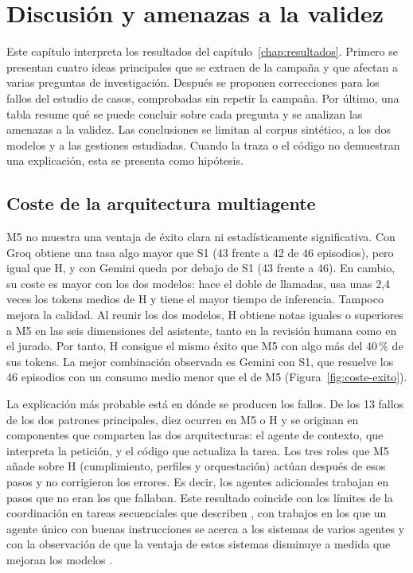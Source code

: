 \chapter{Discusión y amenazas a la validez}
\label{chap:discusion}

Este capítulo interpreta los resultados del capítulo~\ref{chap:resultados}.
Primero se presentan cuatro ideas principales que se extraen de la campaña y
que afectan a varias preguntas de investigación. Después se proponen
correcciones para los fallos del estudio de casos, comprobadas sin repetir la
campaña. Por último, una tabla resume qué se puede concluir sobre cada pregunta
y se analizan las amenazas a la validez. Las conclusiones se limitan al corpus
sintético, a los dos modelos y a las gestiones estudiadas. Cuando la traza o el
código no demuestran una explicación, esta se presenta como hipótesis.

\section{Coste de la arquitectura multiagente}
\label{sec:discusion-coste}

M5 no muestra una ventaja de éxito clara ni estadísticamente significativa. Con
Groq obtiene una tasa algo mayor que S1 (43 frente a 42 de 46 episodios), pero
igual que H, y con Gemini queda por debajo de S1 (43 frente a 46). En cambio,
su coste es mayor con los dos modelos: hace el doble de llamadas, usa unas 2,4
veces los tokens medios de H y tiene el mayor tiempo de inferencia. Tampoco
mejora la calidad. Al reunir los dos modelos, H obtiene notas iguales o
superiores a M5 en las seis dimensiones del asistente, tanto en la revisión
humana como en el jurado. Por tanto, H consigue el mismo éxito que M5 con algo
más del 40\,\% de sus tokens. La mejor combinación observada es Gemini con S1,
que resuelve los 46 episodios con un consumo medio menor que el de M5
(Figura~\ref{fig:coste-exito}).

La explicación más probable está en dónde se producen los fallos. De los 13
fallos de los dos patrones principales, diez ocurren en M5 o H y se originan en
componentes que comparten las dos arquitecturas: el agente de contexto, que
interpreta la petición, y el código que actualiza la tarea. Los tres roles que
M5 añade sobre H (cumplimiento, perfiles y orquestación) actúan después de esos
pasos y no corrigieron los errores. Es decir, los agentes adicionales trabajan
en pasos que no eran los que fallaban. Este resultado coincide con los límites
de la coordinación en tareas secuenciales que describen
\citet{kim2026scalingagents}, con trabajos en los que un agente único con
buenas instrucciones se acerca a los sistemas de varios agentes
\citep{wang2024multiagentdiscussion} y con la observación de que la ventaja de
estos sistemas disminuye a medida que mejoran los modelos
\citep{gao2025singlemulti}.

